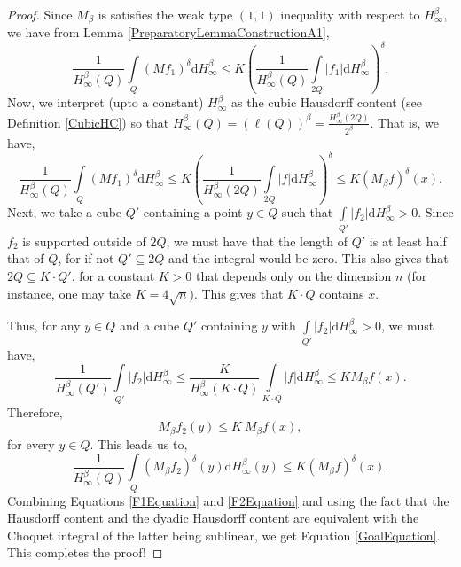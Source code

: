 \documentclass[10pt,a4paper]{amsart}
\begin{document}
\begin{proof}
			Since $M_{\beta}$ is satisfies the weak type $(1, 1)$ inequality with respect to $H^{\beta}_{\infty}$, we have from Lemma \ref{PreparatoryLemmaConstructionA1},
			$$\frac{1}{H^{\beta}_{\infty} \left( Q \right)} \int\limits_{Q} \left( Mf_1 \right)^{\delta} \mathrm{d}H^{\beta}_{\infty} \leq K \left( \frac{1}{H^{\beta}_{\infty} \left( Q \right)} \int\limits_{2Q} \left| f_1 \right| \mathrm{d}H^{\beta}_{\infty} \right)^{\delta}.$$
			Now, we interpret (upto a constant) $H^{\beta}_{\infty}$ as the cubic Hausdorff content (see Definition \ref{CubicHC}) so that $H^{\beta}_{\infty} \left( Q \right) = \left( \ell \left( Q \right) \right)^{\beta} = \frac{H^{\beta}_{\infty} \left( 2Q \right)}{2^{\beta}}$. That is, we have,
			\begin{equation}
				\label{F1Equation}
				\frac{1}{H^{\beta}_{\infty} \left( Q \right)} \int\limits_{Q} \left( Mf_1 \right)^{\delta} \mathrm{d}H^{\beta}_{\infty} \leq K \left( \frac{1}{H^{\beta}_{\infty} \left( 2Q \right)} \int\limits_{2Q} \left| f \right| \mathrm{d}H^{\beta}_{\infty} \right)^{\delta} \leq K \left( M_{\beta}f \right)^{\delta} \left( x \right).
			\end{equation}
			Next, we take a cube $Q'$ containing a point $y \in Q$ such that $\int\limits_{Q'} \left| f_2 \right| \mathrm{d}H^{\beta}_{\infty} > 0$. Since $f_2$ is supported outside of $2Q$, we must have that the length of $Q'$ is at least half that of $Q$, for if not $Q' \subseteq 2Q$ and the integral would be zero. This also gives that $2Q \subseteq K \cdot Q'$, for a constant $K > 0$ that depends only on the dimension $n$ (for instance, one may take $K = 4 \sqrt{n}$). This gives that $K \cdot Q$ contains $x$.
			
			Thus, for any $y \in Q$ and a cube $Q'$ containing $y$ with $\int\limits_{Q'} \left| f_2 \right| \mathrm{d}H^{\beta}_{\infty} > 0$, we must have,
			$$\frac{1}{H^{\beta}_{\infty} \left( Q' \right)} \int\limits_{Q'} \left| f_2 \right| \mathrm{d}H^{\beta}_{\infty} \leq \frac{K}{H^{\beta}_{\infty} \left( K \cdot Q \right)} \int\limits_{K \cdot Q} \left| f \right| \mathrm{d}H^{\beta}_{\infty} \leq K M_{\beta}f \left( x \right).$$
			Therefore,
			$$M_{\beta}f_2 \left( y \right) \leq K \ M_{\beta}f \left( x \right),$$
			for every $y \in Q$. This leads us to,
			\begin{equation}
				\label{F2Equation}
				\frac{1}{H^{\beta}_{\infty} \left( Q \right)} \int\limits_{Q} \left( M_{\beta}f_2 \right)^{\delta} \left( y \right) \mathrm{d}H^{\beta}_{\infty} \left( y \right) \leq K \left( M_{\beta}f \right)^{\delta} \left( x \right).
			\end{equation}
			Combining Equations \eqref{F1Equation} and \eqref{F2Equation} and using the fact that the Hausdorff content and the dyadic Hausdorff content are equivalent with the Choquet integral of the latter being sublinear, we get Equation \eqref{GoalEquation}. This completes the proof!
		\end{proof}
\end{document}
